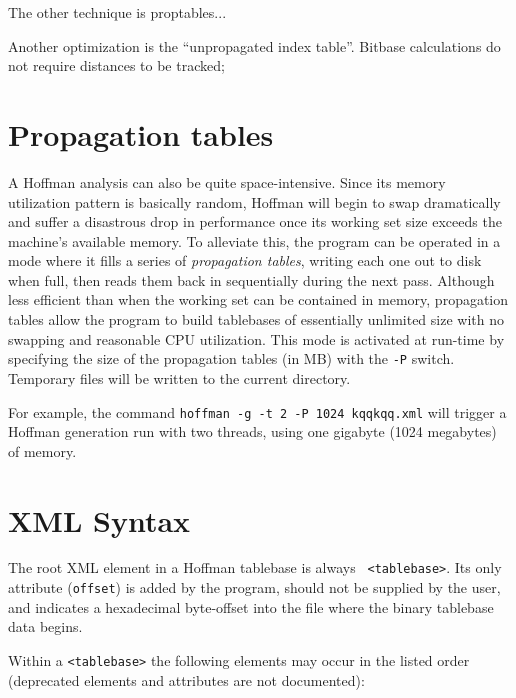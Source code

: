 \documentclass[11pt]{article}
\begin{document}
The other technique is proptables...

Another optimization is the ``unpropagated index table''.  Bitbase
calculations do not require distances to be tracked;



\section{Propagation tables}

A Hoffman analysis can also be quite space-intensive.  Since its
memory utilization pattern is basically random, Hoffman will begin to
swap dramatically and suffer a disastrous drop in performance once its
working set size exceeds the machine's available memory.  To alleviate
this, the program can be operated in a mode where it fills a series of
{\it propagation tables}, writing each one out to disk when full, then
reads them back in sequentially during the next pass.  Although less
efficient than when the working set can be contained in memory,
propagation tables allow the program to build tablebases of
essentially unlimited size with no swapping and reasonable CPU
utilization.  This mode is activated at run-time by specifying the
size of the propagation tables (in MB) with the {\tt -P} switch.
Temporary files will be written to the current directory.

For example, the command {\tt hoffman -g -t 2 -P 1024 kqqkqq.xml} will
trigger a Hoffman generation run with two threads, using one gigabyte
(1024 megabytes) of memory.

\vfil\eject
\section{XML Syntax}

The root XML element in a Hoffman tablebase is always {\tt
<tablebase>}.  Its only attribute ({\tt offset}) is added by the
program, should not be supplied by the user, and indicates a
hexadecimal byte-offset into the file where the binary tablebase data
begins.

Within a {\tt <tablebase>} the following elements may
occur in the listed order (deprecated elements and attributes are not
documented):
\end{document}
